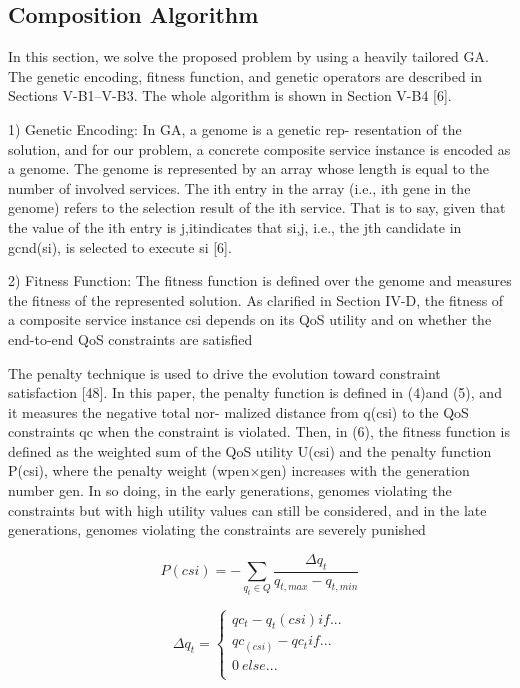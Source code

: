 \documentclass[10pt,journal,compsoc]{IEEEtran}
\begin{document}
\subsection{Composition Algorithm}
In this section, we solve the proposed problem by using a heavily tailored GA. The genetic encoding, fitness function, and genetic operators are described in Sections V-B1–V-B3. The whole algorithm is shown in Section V-B4 [6].

1) Genetic Encoding: In GA, a genome is a genetic rep- resentation of the solution, and for our problem, a concrete composite service instance is encoded as a genome. The genome is represented by an array whose length is equal to the number of involved services. The ith entry in the array (i.e., ith gene in the genome) refers to the selection result of the ith service. That is to say, given that the value of the ith entry is j,itindicates that si,j, i.e., the jth candidate in gcnd(si), is selected to execute si [6]. 

2) Fitness Function: The fitness function is defined over the genome and measures the fitness of the represented solution. As clarified in Section IV-D, the fitness of a composite service instance csi depends on its QoS utility and on whether the end-to-end QoS constraints are satisfied

The penalty technique is used to drive the evolution toward constraint satisfaction [48]. In this paper, the penalty function is defined in (4)and (5), and it measures the negative total nor- malized distance from q(csi) to the QoS constraints qc when the constraint is violated. Then, in (6), the fitness function is defined as the weighted sum of the QoS utility U(csi) and the penalty function P(csi), where the penalty weight (wpen×gen) increases with the generation number gen. In so doing, in the early generations, genomes violating the constraints but with high utility values can still be considered, and in the late generations, genomes violating the constraints are severely punished

\begin{equation}
P(csi) = - \sum_{q_t \in Q} \frac{\Delta q_t}{q_{t,max} - q_{t,min}}
\end{equation}

\begin{equation}
\Delta q_t = 
\left\{ 
\begin{array}{cc}
qc_t - q_t(csi)  if ... \\
qc_(csi) - qc_t  if ... \\
0 \  else ... \\
\end{array} 
\right. 
\end{equation}
\end{document}
